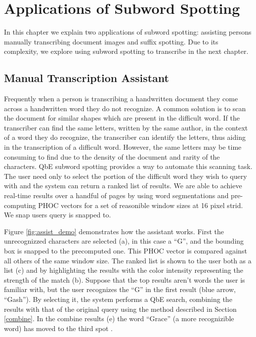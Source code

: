 \documentclass[ms,electronic,twosidetoc,letterpaper,chaptercenter,parttop,lof,lot]{byumsphd}
\begin{document}


\chapter{Applications of Subword Spotting}\label{applications}

In this chapter we explain two applications of subword spotting: assisting persons manually transcribing document images and suffix spotting. Due to its complexity, we explore using subword spotting to transcribe in the next chapter.

\section{Manual Transcription Assistant}
Frequently when a person is transcribing a handwritten document they come across a handwritten word they do not recognize. A common solution is to scan the document for similar shapes which are present in the difficult word. If the transcriber can find the same letters, written by the same author, in the context of a word they do recognize, the transcriber can identify the letters, thus aiding in the transcription of a difficult word. 
However, the same letters may be time consuming to find due to the density of the document and rarity of the characters. QbE subword spotting provides a way to automate this scanning task. The user need only to select the portion of the difficult word they wish to query with and the system can return a ranked list of results.
We are able to achieve real-time results over a handful of pages by using word segmentations and pre-computing PHOC vectors for a set of reasonible window sizes at 16  pixel strid. We snap users query is snapped to. 

Figure \ref{fig:assist_demo} demonstrates how the assistant works. First the unrecognizzed characters are selected (a), in this case a  ``G'', and the bounding box is snapped to the precomputed one. This PHOC vector is compared against all others of the same window size. The ranked list is shown to the user both as a list (c) and by highlighting the results with the color intensity representing the strength of the match (b). Suppose that the top results aren't words the user is familiar with, but the user recognizes the ``G'' in the first result (blue arrow, ``Gash''). By selecting it, the system performs a QbE search, combining the results with that of the original query using the method described in Section \ref{combine}. In the combine results (e) the word ``Grace'' (a more recognizible word) has moved to the third spot .
\end{document}
